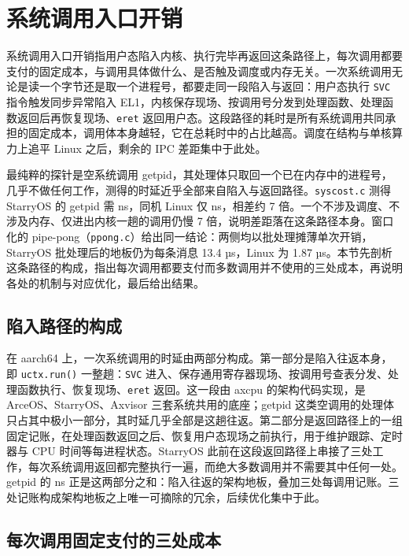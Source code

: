 \section{系统调用入口开销}

系统调用入口开销指用户态陷入内核、执行完毕再返回这条路径上，每次调用都要支付的固定成本，与调用具体做什么、是否触及调度或内存无关。一次系统调用无论是读一个字节还是取一个进程号，都要走同一段陷入与返回：用户态执行 \texttt{SVC} 指令触发同步异常陷入 EL1，内核保存现场、按调用号分发到处理函数、处理函数返回后再恢复现场、\texttt{eret} 返回用户态。这段路径的耗时是所有系统调用共同承担的固定成本，调用体本身越轻，它在总耗时中的占比越高。调度在结构与单核算力上追平 Linux 之后，剩余的 IPC 差距集中于此处。

最纯粹的探针是空系统调用 getpid，其处理体只取回一个已在内存中的进程号，几乎不做任何工作，测得的时延近乎全部来自陷入与返回路径。\texttt{syscost.c} 测得 StarryOS 的 getpid 需 \nGetpidBefore{} ns，同机 Linux 仅 \nGetpidLin{} ns，相差约 7 倍。一个不涉及调度、不涉及内存、仅进出内核一趟的调用仍慢 7 倍，说明差距落在这条路径本身。窗口化的 pipe-pong（\texttt{ppong.c}）给出同一结论：两侧均以批处理摊薄单次开销，StarryOS 批处理后的地板仍为每条消息 13.4 µs，Linux 为 1.87 µs。本节先剖析这条路径的构成，指出每次调用都要支付而多数调用并不使用的三处成本，再说明各处的机制与对应优化，最后给出结果。

\subsection{陷入路径的构成}

在 aarch64 上，一次系统调用的时延由两部分构成。第一部分是陷入往返本身，即 \texttt{uctx.run()} 一整趟：\texttt{SVC} 进入、保存通用寄存器现场、按调用号查表分发、处理函数执行、恢复现场、\texttt{eret} 返回。这一段由 axcpu 的架构代码实现，是 ArceOS、StarryOS、Axvisor 三套系统共用的底座；getpid 这类空调用的处理体只占其中极小一部分，其时延几乎全部是这趟往返。第二部分是返回路径上的一组固定记账，在处理函数返回之后、恢复用户态现场之前执行，用于维护跟踪、定时器与 CPU 时间等每进程状态。StarryOS 此前在这段返回路径上串接了三处工作，每次系统调用返回都完整执行一遍，而绝大多数调用并不需要其中任何一处。getpid 的 \nGetpidBefore{} ns 正是这两部分之和：陷入往返的架构地板，叠加三处每调用记账。三处记账构成架构地板之上唯一可摘除的冗余，后续优化集中于此。

\subsection{每次调用固定支付的三处成本}

